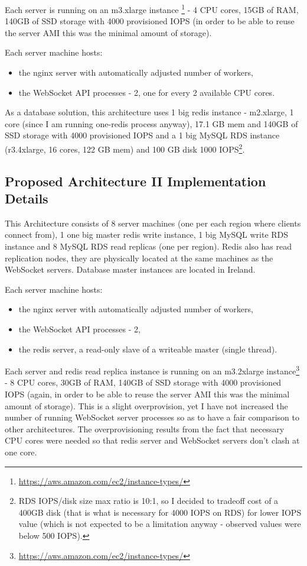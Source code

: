 \documentclass{uvamscse}
\begin{document}
Each server is running on an m3.xlarge instance \footnote{\url{https://aws.amazon.com/ec2/instance-types/}} - 4 CPU cores, 15GB of RAM, 140GB of SSD storage with 4000 provisioned IOPS (in order to be able to reuse the server AMI this was the minimal amount of storage).

Each server machine hosts:
\begin{itemize}
  \item the nginx server with automatically adjusted number of workers,
  \item the WebSocket API processes - 2, one for every 2 available CPU cores.
\end{itemize}

As a database solution, this architecture uses 1 big redis instance - m2.xlarge, 1 core (since I am running one-redis process anyway), 17.1 GB mem and 140GB of SSD storage with 4000 provisioned IOPS and a 1 big MySQL RDS instance (r3.4xlarge, 16 cores, 122 GB mem) and 100 GB disk 1000 IOPS\footnote{RDS IOPS/disk size max ratio is 10:1, so I decided to tradeoff cost of a 400GB disk (that is what is necessary for 4000 IOPS on RDS) for lower IOPS value (which is not expected to be a limitation anyway - observed values were below 500 IOPS).}.

\subsection{Proposed Architecture II Implementation Details}\label{Proposed Architecture II Implementation Details}

This Architecture consists of 8 server machines (one per each region where clients connect from), 1 one big master redis write instance, 1 big MySQL write RDS instance and 8 MySQL RDS read replicas (one per region). Redis also has read replication nodes, they are physically located at the same machines as the WebSocket servers. Database master instances are located in Ireland.

Each server machine hosts:
\begin{itemize}
  \item the nginx server with automatically adjusted number of workers,
  \item the WebSocket API processes - 2,
  \item the redis server, a read-only slave of a writeable master (single thread).
\end{itemize}

Each server and redis read replica instance is running on an m3.2xlarge instance\footnote{\url{https://aws.amazon.com/ec2/instance-types/}} - 8 CPU cores, 30GB of RAM, 140GB of SSD storage with 4000 provisioned IOPS (again, in order to be able to reuse the server AMI this was the minimal amount of storage). This is a slight overprovision, yet I have not increased the number of running WebSocket server processes so as to have a fair comparison to other architectures. The overprovisioning results from the fact that necessary CPU cores were needed so that redis server and WebSocket servers don't clash at one core.
\end{document}
